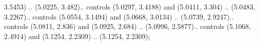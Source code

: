 3.5453) .. (5.0225, 3.482).. controls (5.0297, 3.4188) and (5.0411, 3.304) .. (5.0483, 3.2267).. controls (5.0554, 3.1494) and (5.0668, 3.0134) .. (5.0739, 2.9247).. controls (5.0811, 2.836) and (5.0925, 2.684) .. (5.0996, 2.5877).. controls (5.1068, 2.4914) and (5.1254, 2.2309) .. (5.1254, 2.2309);




